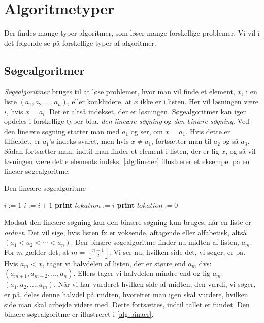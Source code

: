 \section{Algoritmetyper}
Der findes mange typer algoritmer, som løser mange forskellige problemer. Vi vil i det følgende se på forskellige typer af algoritmer.
\subsection{Søgealgoritmer}
\emph{Søgealgoritmer} bruges til at løse problemer, hvor man vil finde et element, $x$, i en liste $(a_{1}, a_{2}, \dotsc, a_{n})$, eller konkludere, at $x$ ikke er i listen. Her vil løsningen være $i$, hvis $x=a_{i}$. Det er altså indekset, der er løsningen. Søgealgoritmer kan igen opdeles i forskellige typer bl.a. \emph{den lineære søgning} og \emph{den binære søgning}. Ved den lineære søgning starter man med $a_1$ og ser, om $x=a_{1}$. Hvis dette er tilfældet, er $a_{1}$'s indeks svaret, men hvis $x \neq a_{1}$, fortsætter man til $a_{2}$ og så $a_{3}$. Sådan fortsætter man, indtil man finder et element i listen, der er lig $x$, og så vil løsningen være dette elements indeks. \autoref{alg:lineaer} illustrerer et eksempel på en lineær søgealgoritme:

\begin{algorithm}[H] 
\caption{Den lineære søgealgoritme}
\begin{algorithmic}[1]

    \State $i:=1$
        \State $i:=i+1$
    \State \textbf{print} $lokation:=i$
    \Else
    \State \textbf{print} $lokation:=0$
    \EndIf
    \EndWhile  \label{roy's loop}
\EndProcedure

\end{algorithmic}
\label{alg:lineaer}
\end{algorithm}


Modsat den lineære søgning kan den binære søgning kun bruges, når en liste er \emph{ordnet}. Det vil sige, hvis listen fx er voksende, aftagende eller alfabetisk, altså $(a_{1}<a_{2}<\dotsb<a_{n})$. Den binære søgealgoritme finder nu midten af listen, $a_{m}$. For $m$ gælder det, at $m=\left \lfloor \frac{n+1}{2} \right \rfloor$. Vi ser nu, hvilken side det, vi søger, er på. Hvis $a_{m}<x$, tager vi halvdelen af listen, der er større end $a_{m}$ dvs: $(a_{m+1}, a_{m+2},\dotsc,a_{n})$. Ellers tager vi halvdelen mindre end og lig $a_{m}$: $(a_{1}, a_{2},\dotsc,a_{m})$. Når vi har vurderet hvilken side af midten, den værdi, vi søger, er på, deles denne halvdel på midten, hvorefter man igen skal vurdere, hvilken side man skal arbejde videre med. Dette fortsættes, indtil tallet er fundet. Den binære søgealgoritme er illustreret i \autoref{alg:binaer}.

